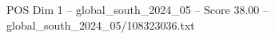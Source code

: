 \begin{textsample}{POS Dim 1 – global\_south\_2024\_05 – Score 38.00 – global\_south\_2024\_05/108323036.txt}
\end{textsample}
